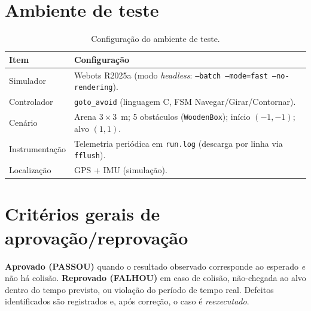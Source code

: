 \section{Ambiente de teste}
\begin{table}[H]\centering
\caption{Configuração do ambiente de teste.}
\begin{tabularx}{\textwidth}{@{}l X@{}}
\toprule
\textbf{Item} & \textbf{Configuração} \\
\midrule
Simulador & Webots R2025a (modo \emph{headless}: \texttt{--batch --mode=fast --no-rendering}). \\
Controlador & \texttt{goto\_avoid} (linguagem C, FSM Navegar/Girar/Contornar). \\
Cenário & Arena $3\times3$~m; 5 obstáculos (\texttt{WoodenBox}); início $(-1,-1)$; alvo $(1,1)$. \\
Instrumentação & Telemetria periódica em \texttt{run.log} (descarga por linha via \texttt{fflush}). \\
Localização & GPS + IMU (simulação). \\
\bottomrule
\end{tabularx}
\end{table}

\section{Critérios gerais de aprovação/reprovação}
\textbf{Aprovado (PASSOU)} quando o resultado observado corresponde ao esperado \emph{e} não há colisão. \textbf{Reprovado (FALHOU)} em caso de colisão, não-chegada ao alvo dentro do tempo previsto, ou violação do período de tempo real. Defeitos identificados são registrados e, após correção, o caso é \emph{reexecutado}.

